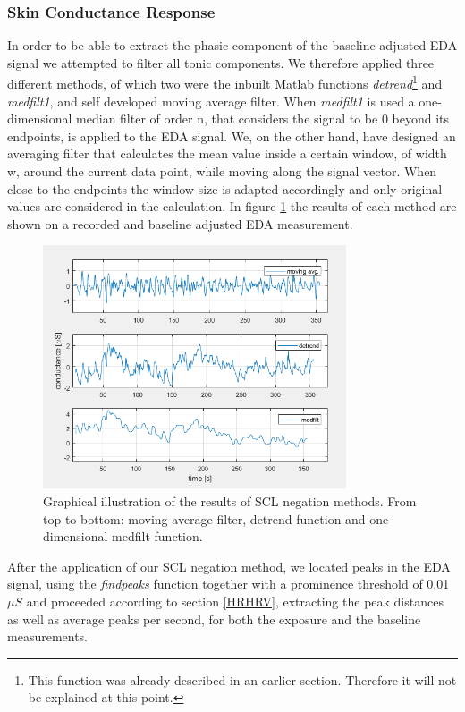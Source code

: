 \subsubsection{Skin Conductance Response}
In order to be able to extract the phasic component of the baseline adjusted EDA signal we attempted to filter all tonic components. We therefore applied three different methods, of which two were the inbuilt Matlab functions \textit{detrend}\footnote{This function was already described in an earlier section. Therefore it will not be explained at this point.} and \textit{medfilt1}, and self developed moving average filter. When \textit{medfilt1} is used a one-dimensional median filter of order n, that considers the signal to be 0 beyond its endpoints, is applied to the EDA signal. We, on the other hand, have designed an averaging filter that calculates the mean value inside a certain window, of width w, around the current data point, while moving along the signal vector. When close to the endpoints the window size is adapted accordingly and only original values are considered in the calculation. In figure \ref{filtcompImg} the results of each method are shown on a recorded and baseline adjusted EDA measurement. 

\newpage
\begin{figure}[H]
\centering
\includegraphics[width=0.8\textwidth]{images/filtcomp.png}
\caption{Graphical illustration of the results of SCL negation methods. From top to bottom: moving average filter, detrend function and one-dimensional medfilt function.}
\label{filtcompImg}
\end{figure}
   
After the application of our SCL negation method, we located peaks in the EDA signal, using the \textit{findpeaks} function together with a prominence threshold of 0.01 $\mu S$ and proceeded according to section \ref{HRHRV}, extracting the peak distances as well as average peaks per second, for both the exposure and the baseline measurements.

